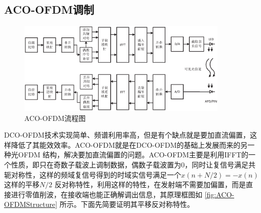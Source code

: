 \subsection{ACO-OFDM调制}

\begin{figure}[h]
    \centering
    \includegraphics[width=0.9\textwidth]{figures/chapter-2/ACO-OFDMStructure.eps}
    \caption{ACO-OFDM流程图}
    \label{fig:ACO-OFDMStructure}
\end{figure}
DCO-OFDM技术实现简单、频谱利用率高，但是有个缺点就是要加直流偏置，这样降低了其能效效率。ACO-OFDM就是在DCO-OFDM的基础上发展而来的另一种光OFDM 结构，解决要加直流偏置的问题。ACO-OFDM主要是利用IFFT的一个性质，即只在奇数子载波上调制数据，偶数子载波置为0，同时让复信号满足共轭对称性，这样的频域复信号得到的时域实信号满足一个$x(n+N/2)=-x(n)$这样的平移$N/2$ 反对称特性，利用这样的特性，在发射端不需要加偏置，而是直接进行零值削波，在接收端也能正确解调出信息，其原理框图如
\autoref{fig:ACO-OFDMStructure} 所示。下面先简要证明其平移反对称特性。

